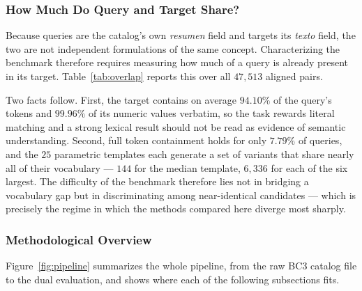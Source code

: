 \documentclass[preprint,review,12pt]{elsarticle}
\begin{document}
\subsubsection{How Much Do Query and Target Share?}
\label{subsec:overlap}

Because queries are the catalog's own \textit{resumen} field and targets its \textit{texto} field, the two are not independent formulations of the same concept. Characterizing the benchmark therefore requires measuring how much of a query is already present in its target. Table~\ref{tab:overlap} reports this over all $47{,}513$ aligned pairs.

\begin{table}[ht]
\centering
\caption{Lexical and numeric overlap between each query (\textit{resumen}) and its target document (\textit{texto}), over all 47,513 aligned pairs. Coverage is the fraction of query tokens, or query numeric values, that also occur in the target.}
\label{tab:overlap}

\end{table}

Two facts follow. First, the target contains on average $94.10\%$ of the query's tokens and $99.96\%$ of its numeric values verbatim, so the task rewards literal matching and a strong lexical result should not be read as evidence of semantic understanding. Second, full token containment holds for only $7.79\%$ of queries, and the $25$ parametric templates each generate a set of variants that share nearly all of their vocabulary --- $144$ for the median template, $6{,}336$ for each of the six largest. The difficulty of the benchmark therefore lies not in bridging a vocabulary gap but in discriminating among near-identical candidates --- which is precisely the regime in which the methods compared here diverge most sharply.

\subsubsection{Methodological Overview}

Figure~\ref{fig:pipeline} summarizes the whole pipeline, from the raw BC3 catalog file to the dual evaluation, and shows where each of the following subsections fits.
\end{document}

